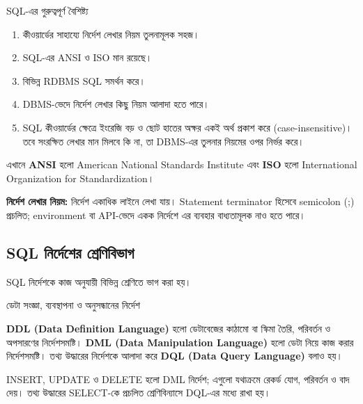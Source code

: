 \begin{keypointbox}{SQL-এর গুরুত্বপূর্ণ বৈশিষ্ট্য}


\begin{enumerate}







\item কীওয়ার্ডের সাহায্যে নির্দেশ লেখার নিয়ম তুলনামূলক সহজ।

\item SQL-এর ANSI ও ISO মান রয়েছে।

\item বিভিন্ন RDBMS SQL সমর্থন করে।

\item DBMS-ভেদে নির্দেশ লেখার কিছু নিয়ম আলাদা হতে পারে।

\item SQL কীওয়ার্ডের ক্ষেত্রে ইংরেজি বড় ও ছোট হাতের অক্ষর একই অর্থ প্রকাশ করে (case-insensitive)। তবে সংরক্ষিত লেখার মান মিলবে কি না, তা DBMS-এর তুলনার নিয়মের ওপর নির্ভর করে। 
\end{enumerate}


এখানে \textbf{ANSI} হলো American National Standards Institute এবং \textbf{ISO} হলো International Organization for Standardization।

\textbf{নির্দেশ লেখার নিয়ম:} নির্দেশ একাধিক লাইনে লেখা যায়।
Statement terminator হিসেবে semicolon (;) প্রচলিত; environment বা API-ভেদে একক নির্দেশে এর ব্যবহার বাধ্যতামূলক নাও হতে পারে।
\end{keypointbox}

\subsection{SQL নির্দেশের শ্রেণিবিভাগ}

SQL নির্দেশকে কাজ অনুযায়ী বিভিন্ন শ্রেণিতে ভাগ করা হয়।

\begin{definitionbox}{ডেটা সংজ্ঞা, ব্যবস্থাপনা ও অনুসন্ধানের নির্দেশ}
\raggedright
\textbf{DDL (Data Definition Language)} হলো ডেটাবেজের কাঠামো বা স্কিমা তৈরি, পরিবর্তন ও অপসারণের নির্দেশসমষ্টি। \textbf{DML (Data Manipulation Language)} হলো ডেটা নিয়ে কাজ করার নির্দেশসমষ্টি। তথ্য উদ্ধারের নির্দেশকে আলাদা করে \textbf{DQL (Data Query Language)} বলাও হয়।
\end{definitionbox}
INSERT, UPDATE ও DELETE হলো DML নির্দেশ; এগুলো যথাক্রমে রেকর্ড যোগ, পরিবর্তন ও বাদ দেয়। তথ্য উদ্ধারের SELECT-কে প্রচলিত শ্রেণিবিন্যাসে DQL-এর মধ্যে রাখা হয়।

